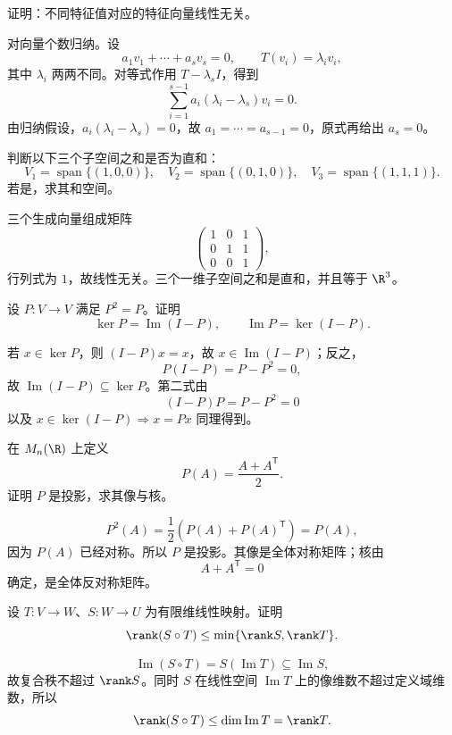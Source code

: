 \begin{exercise}[level=standard]
证明：不同特征值对应的特征向量线性无关。
\begin{solution}
对向量个数归纳。设
\[
a_1v_1+\cdots+a_sv_s=0,
\qquad
T(v_i)=\lambda_iv_i,
\]
其中 $\lambda_i$ 两两不同。对等式作用 $T-\lambda_sI$，得到
\[
\sum_{i=1}^{s-1}a_i(\lambda_i-\lambda_s)v_i=0.
\]
由归纳假设，$a_i(\lambda_i-\lambda_s)=0$，故 $a_1=\cdots=a_{s-1}=0$，原式再给出 $a_s=0$。
\end{solution}
\end{exercise}

\begin{exercise}[level=standard]
判断以下三个子空间之和是否为直和：
\[
V_1=\operatorname{span}\{(1,0,0)\},\quad
V_2=\operatorname{span}\{(0,1,0)\},\quad
V_3=\operatorname{span}\{(1,1,1)\}.
\]
若是，求其和空间。
\begin{solution}
三个生成向量组成矩阵
\[
\begin{pmatrix}
1&0&1\\
0&1&1\\
0&0&1
\end{pmatrix},
\]
行列式为 $1$，故线性无关。三个一维子空间之和是直和，并且等于 $\R^3$。
\end{solution}
\end{exercise}

\begin{exercise}[level=standard]
设 $P:V\to V$ 满足 $P^2=P$。证明
\[
\ker P=\operatorname{Im}(I-P),
\qquad
\operatorname{Im}P=\ker(I-P).
\]
\begin{solution}
若 $x\in\ker P$，则 $(I-P)x=x$，故 $x\in\operatorname{Im}(I-P)$；反之，
\[
P(I-P)=P-P^2=0,
\]
故 $\operatorname{Im}(I-P)\subseteq\ker P$。第二式由
\[
(I-P)P=P-P^2=0
\]
以及 $x\in\ker(I-P)\Rightarrow x=Px$ 同理得到。
\end{solution}
\end{exercise}

\begin{exercise}[level=standard]
在 $M_n(\R)$ 上定义
\[
P(A)=\frac{A+A^{\mathsf T}}2.
\]
证明 $P$ 是投影，求其像与核。
\begin{solution}
\[
P^2(A)
=\frac12\left(P(A)+P(A)^{\mathsf T}\right)
=P(A),
\]
因为 $P(A)$ 已经对称。所以 $P$ 是投影。其像是全体对称矩阵；核由
\[
A+A^{\mathsf T}=0
\]
确定，是全体反对称矩阵。
\end{solution}
\end{exercise}

\begin{exercise}[level=advanced]
设 $T:V\to W$、$S:W\to U$ 为有限维线性映射。证明
\[
\rank(S\circ T)\le
\min\{\rank S,\rank T\}.
\]
\begin{solution}
\[
\operatorname{Im}(S\circ T)=S(\operatorname{Im}T)
\subseteq\operatorname{Im}S,
\]
故复合秩不超过 $\rank S$。同时 $S$ 在线性空间 $\operatorname{Im}T$ 上的像维数不超过定义域维数，所以
\[
\rank(S\circ T)\le\dim\operatorname{Im}T=\rank T.
\]
\end{solution}
\end{exercise}


